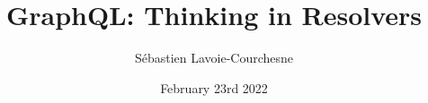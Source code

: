 \documentclass{beamer}
\title{GraphQL: Thinking in Resolvers}
\author{Sébastien Lavoie-Courchesne}
\date{February 23rd 2022}
\begin{document}
\begin{frame}
  \titlepage{}
\end{frame}
\end{document}
